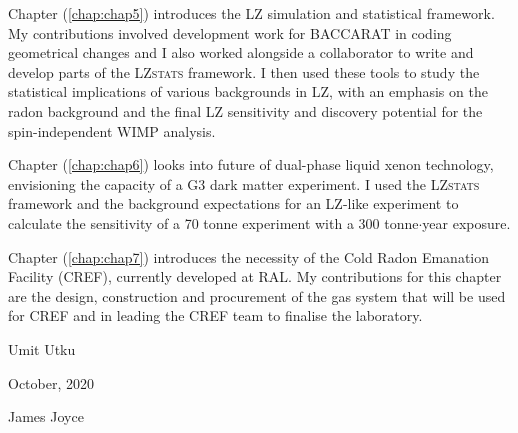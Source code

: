 \begin{declaration}
Chapter (\ref{chap:chap5}) introduces the LZ simulation and statistical framework. My contributions involved development work for \textsc{BACCARAT} in coding geometrical changes and I also worked alongside a collaborator to write and develop parts of the \textsc{LZstats} framework. I then used these tools to study the statistical implications of various backgrounds in LZ, with an emphasis on the radon background and the final LZ sensitivity and discovery potential for the spin-independent WIMP analysis.
  
Chapter (\ref{chap:chap6}) looks into future of dual-phase liquid xenon technology, envisioning the capacity of a G3 dark matter experiment. I used the \textsc{LZstats} framework and the background expectations for an LZ-like experiment to calculate the sensitivity of a 70 tonne experiment with a 300 tonne$\cdot$year exposure.  
  
Chapter (\ref{chap:chap7}) introduces the necessity of the Cold Radon Emanation Facility (CREF), currently developed at RAL. My contributions for this chapter are the design, construction and procurement of the gas system that will be used for CREF and in leading the CREF team to finalise the laboratory.    
  
\vspace*{1cm}
\begin{flushright}
Umit Utku
\end{flushright}

\begin{flushright}
October, 2020
\end{flushright}

\end{declaration}


\tableofcontents


\listoffigures
\listoftables


%
  {James Joyce}
\thispagestyle{empty}
